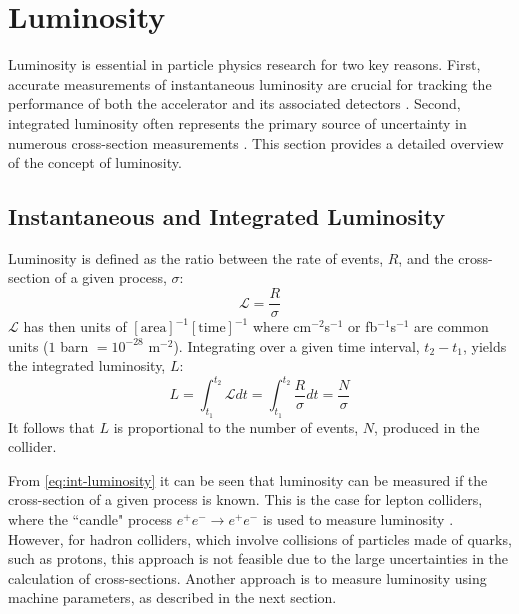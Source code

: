 \section{Luminosity}
\label{sec:luminosity}

Luminosity is essential in particle physics research for two key reasons. First, accurate measurements of instantaneous luminosity are crucial for tracking the performance of both the accelerator and its associated detectors \cite{PhysRevAccelBeams.21.102801}. Second, integrated luminosity often represents the primary source of uncertainty in numerous cross-section measurements \cite{cms2022measurement, sirunyan2019measurement}. This section provides a detailed overview of the concept of luminosity.

\subsection{Instantaneous and Integrated Luminosity}

Luminosity is defined as the ratio between the rate of events, $R$, and the cross-section of a given process, $\sigma$:
\begin{equation}
    \label{eq:inst-luminosity}
    \mathcal{L} = \frac{R}{\sigma}
\end{equation}
$\mathcal{L}$ has then units of $[\mathrm{area}]^{-1} [\mathrm{time}]^{-1}$ where cm$^{-2}$s$^{-1}$ or fb$^{-1}$s$^{-1}$ are common units ($1$ barn  $= 10^{-28}$ m$^{-2}$). Integrating over a given time interval, $t_2 - t_1$, yields the integrated luminosity, $L$:
\begin{equation}
    \label{eq:int-luminosity}
    L = \int_{t_1}^{t_2} \mathcal{L} dt = \int_{t_1}^{t_2} \frac{R}{\sigma} dt = \frac{N}{\sigma}
\end{equation}
It follows that $L$ is proportional to the number of events, $N$, produced in the collider.

From \autoref{eq:int-luminosity} it can be seen that luminosity can be measured if the cross-section of a given process is known. This is the case for lepton colliders, where the ``candle" process $e^+ e^- \rightarrow e^+ e^-$ is used to measure luminosity \cite{Burkhardt:1056691}. However, for hadron colliders, which involve collisions of particles made of quarks, such as protons, this approach is not feasible due to the large uncertainties in the calculation of cross-sections. Another approach is to measure luminosity using machine parameters, as described in the next section.


